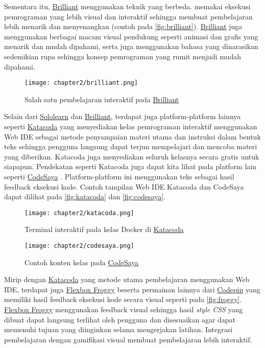 Sementara itu, \href{https://brilliant.org}{Brilliant} menggunakan teknik yang berbeda. \textcite{brilliant2021media} memakai eksekusi pemrograman yang lebih visual dan interaktif sehingga membuat pembelajaran lebih menarik dan menyenangkan (contoh pada \autoref{fig:brilliant}). \href{https://brilliant.org}{Brilliant} juga menggunakan berbagai macam visual pendukung seperti animasi dan grafis yang menarik dan mudah dipahami, serta juga menggunakan bahasa yang dinarasikan sedemikian rupa sehingga konsep pemrograman yang rumit menjadi mudah dipahami.

\begin{figure}[H]
  \centering
  \texttt{[image: chapter2/brilliant.png]}
  \caption{\label{fig:brilliant}Salah satu pembelajaran interaktif pada \href{https://brilliant.org}{Brilliant}}
\end{figure}

Selain dari \href{https://www.sololearn.com}{Sololearn} dan \href{https://brilliant.org}{Brilliant}, terdapat juga platform-platform lainnya seperti \href{https://www.katacoda.com/}{Katacoda} \parencite{katacoda2021media} yang menyediakan kelas pemrograman interaktif menggunakan Web IDE sebagai metode penyampaian materi utama dan instruksi dalam bentuk teks sehingga pengguna langsung dapat terjun mempelajari dan mencoba materi yang diberikan. Katacoda juga menyediakan seluruh kelasnya secara gratis untuk siapapun. Pendekatan seperti Katacoda juga dapat kita lihat pada platform lain seperti \href{https://www.codesaya.com/}{CodeSaya} \parencite{codesaya2021media}. Platform-platform ini menggunakan teks sebagai hasil feedback eksekusi kode. Contoh tampilan Web IDE Katacoda dan CodeSaya dapat dilihat pada \autoref{fig:katacoda} dan \autoref{fig:codesaya}.

\begin{figure}[H]
  \centering
  \texttt{[image: chapter2/katacoda.png]}
  \caption{\label{fig:katacoda}Terminal interaktif pada kelas Docker di \href{https://www.katacoda.com/}{Katacoda}}
\end{figure}

\begin{figure}[H]
  \centering
  \texttt{[image: chapter2/codesaya.png]}
  \caption{\label{fig:codesaya}Contoh konten kelas pada \href{https://www.codesaya.com/}{CodeSaya}}
\end{figure}

Mirip dengan \href{https://www.katacoda.com/}{Katacoda} yang metode utama pembelajaran menggunakan Web IDE, terdapat juga \href{https://flexboxfroggy.com/}{Flexbox Froggy} \parencite{froggy2021media} beserta permainan lainnya dari \href{https://codepip.com/games/}{Codepip} yang memiliki hasil feedback eksekusi kode secara visual seperti pada \autoref{fig:froggy}. \href{https://flexboxfroggy.com/}{Flexbox Froggy} menggunakan feedback visual sehingga hasil \textit{style CSS} yang dibuat dapat langsung terlihat oleh pengguna dan disesuaikan agar dapat memenuhi tujuan yang diinginkan selama mengerjakan latihan. Integrasi pembelajaran dengan gamifikasi visual membuat pembelajaran lebih interaktif.

